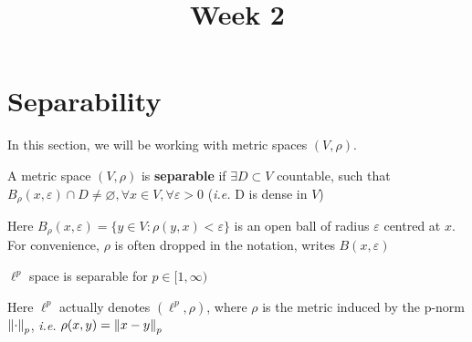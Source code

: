 \documentclass{article}
\title{Week 2}
\begin{document}
\maketitle


\section{Separability}

In this section, we will be working with metric spaces \((V, \rho)\).

\begin{definition}[Separable]
	A metric space $(V,\rho)$ is \textbf{separable} if \(\exists D \subset V\) countable,
	such that \(B_{\rho}(x, \varepsilon) \cap D \neq \varnothing, \forall x \in V, \forall \varepsilon >0\)
	(\textit{i.e.} D is dense in \(V\))
\end{definition}

Here \(B_{\rho}(x, \varepsilon)=\{y \in V: \rho (y,x) < \varepsilon\}\) is an open ball of radius \(\varepsilon\)
centred at \(x\). For convenience, $\rho$ is often dropped in the notation, writes $B(x, \varepsilon)$

\begin{proposition}
	\(\ell^p\) space is separable for \(p \in [1, \infty)\)
\end{proposition}
Here $\ell^p$ actually denotes  \((\ell^p, \rho)\), where \(\rho\) is the metric induced by the p-norm \(\left\|{\cdot}\right\|_p\),
\textit{i.e.} \(\rho(x,y)=\left\|{x-y}\right\|_p\)
\end{document}
